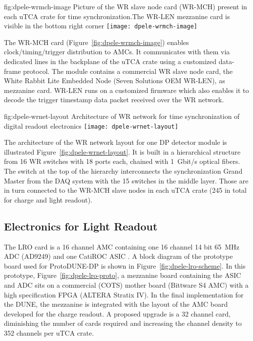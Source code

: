 \begin{dunefigure}{fig:dpele-wrmch-image}
{Picture of the WR slave node card (WR-MCH) present in each uTCA crate for time synchronization.The WR-LEN mezzanine card is visible in the bottom right corner}
\texttt{[image: dpele-wrmch-image]}
\end{dunefigure}

The WR-MCH card (Figure~\ref{fig:dpele-wrmch-image}) enables clock/timing/trigger distribution to AMCs. It communicates with them via dedicated lines in the backplane of the uTCA crate using a customized data-frame protocol. The module contains a commercial WR slave node card, the White Rabbit Lite Embedded Node (Seven Solutions OEM WR-LEN), as mezzanine card. WR-LEN runs on a customized firmware which also enables it to decode the trigger timestamp data packet received over the WR network.

\begin{dunefigure}{fig:dpele-wrnet-layout}
{Architecture of WR network for time synchronization of digital readout electronics}
\texttt{[image: dpele-wrnet-layout]}
\end{dunefigure}

The architecture of the WR network layout for one DP detector module is illustrated Figure~\ref{fig:dpele-wrnet-layout}. It is built in a hierarchical structure from \num{16} WR switches with \num{18} ports each,  chained with \SI{1}{Gbit/s} optical fibers. The switch at the top of the hierarchy interconnects the synchronization Grand Master from the DAQ system with the \num{15} switches in the middle layer. Those are in turn connected to the WR-MCH slave nodes in each uTCA crate (245 in total for charge and light readout). 


\subsection{Electronics for Light Readout}
\label{sec:fddp-tpc-elec-design-lro}

%
The LRO card is a \num{16} channel AMC containing one \num{16} channel \num{14} bit \SI{65}{\MHz} ADC (AD9249) and one CatiROC ASIC \cite{catiroc}. A block diagram of the prototype board used for ProtoDUNE-DP is shown in Figure~\ref{fig:dpele-lro-scheme}. In this prototype, Figure~\ref{fig:dpele-lro-proto}, a mezzanine board containing the ASIC and ADC sits on a commercial (COTS) mother board (Bittware S4 AMC) with a high specification FPGA (ALTERA Stratix IV). In the final implementation for the DUNE, the mezzanine is integrated with the layout of the AMC board developed for the charge readout.  
A proposed upgrade is a \num{32} channel card, diminishing the number of cards required and increasing the channel density to \num{352} channels per uTCA crate.


